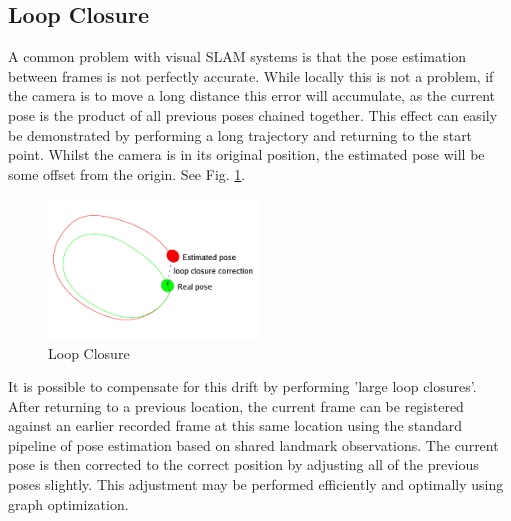 
\subsection{Loop Closure}
\label{subsec:loop_closure}

A common problem with visual SLAM systems is that the pose estimation between frames is not perfectly accurate.  While locally this is not a problem, if the camera is to move a long distance this error will accumulate, as the current pose is the product of all previous poses chained together.  This effect can easily be demonstrated by performing a long trajectory and returning to the start point.  Whilst the camera is in its original position, the estimated pose will be some offset from the origin. See Fig. \ref{fig:loop_closure}.

\begin{figure}[h]
  \centering
    \includegraphics[width=0.5\textwidth]{chapters/images/loop-closure}
  \caption{Loop Closure}
  \label{fig:loop_closure}
\end{figure}

It is possible to compensate for this drift by performing 'large loop closures'. After returning to a previous location, the current frame can be registered against an earlier recorded frame at this same location using the standard pipeline of pose estimation based on shared landmark observations.  The current pose is then corrected to the correct position by adjusting all of the previous poses slightly.  This adjustment may be performed efficiently and optimally using graph optimization.

